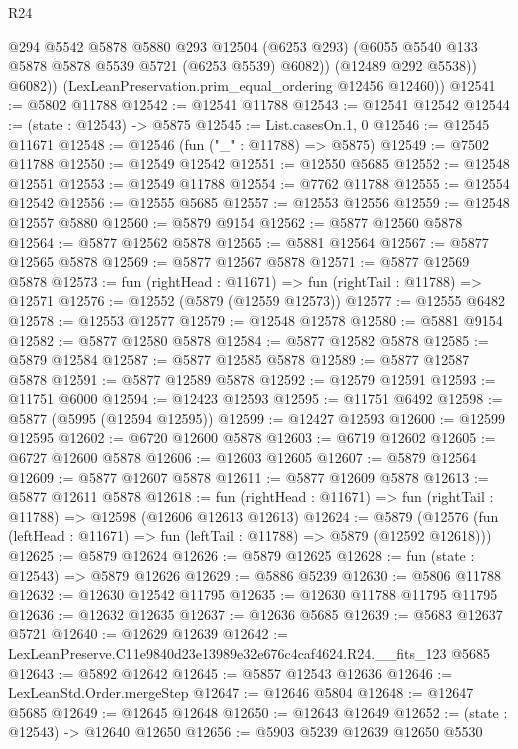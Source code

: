\begin{lexlean}{R24}
\begin{coremodule}
              @294
              @5542
              @5878
              @5880
              @293
              @12504
              (@6253 @293)
              (@6055 @5540 @133 @5878 @5878 @5539 @5721 (@6253 @5539) @6082))
            (@12489 @292 @5538))
          @6082))
      (LexLeanPreservation.prim_equal_ordering @12456 @12460))
@12541 := @5802 @11788
@12542 := @12541 @11788
@12543 := @12541 @12542
@12544 := (state : @12543) -> @5875
@12545 := List.casesOn.{1, 0}
@12546 := @12545 @11671
@12548 := @12546 (fun ("_" : @11788) => @5875)
@12549 := @7502 @11788
@12550 := @12549 @12542
@12551 := @12550 @5685
@12552 := @12548 @12551
@12553 := @12549 @11788
@12554 := @7762 @11788
@12555 := @12554 @12542
@12556 := @12555 @5685
@12557 := @12553 @12556
@12559 := @12548 @12557 @5880
@12560 := @5879 @9154
@12562 := @5877 @12560 @5878
@12564 := @5877 @12562 @5878
@12565 := @5881 @12564
@12567 := @5877 @12565 @5878
@12569 := @5877 @12567 @5878
@12571 := @5877 @12569 @5878
@12573 := fun (rightHead : @11671) => fun (rightTail : @11788) => @12571
@12576 := @12552 (@5879 (@12559 @12573))
@12577 := @12555 @6482
@12578 := @12553 @12577
@12579 := @12548 @12578
@12580 := @5881 @9154
@12582 := @5877 @12580 @5878
@12584 := @5877 @12582 @5878
@12585 := @5879 @12584
@12587 := @5877 @12585 @5878
@12589 := @5877 @12587 @5878
@12591 := @5877 @12589 @5878
@12592 := @12579 @12591
@12593 := @11751 @6000
@12594 := @12423 @12593
@12595 := @11751 @6492
@12598 := @5877 (@5995 (@12594 @12595))
@12599 := @12427 @12593
@12600 := @12599 @12595
@12602 := @6720 @12600 @5878
@12603 := @6719 @12602
@12605 := @6727 @12600 @5878
@12606 := @12603 @12605
@12607 := @5879 @12564
@12609 := @5877 @12607 @5878
@12611 := @5877 @12609 @5878
@12613 := @5877 @12611 @5878
@12618 := fun (rightHead : @11671) => fun (rightTail : @11788) => @12598 (@12606 @12613 @12613)
@12624 := @5879
    (@12576 (fun (leftHead : @11671) => fun (leftTail : @11788) => @5879 (@12592 @12618)))
@12625 := @5879 @12624
@12626 := @5879 @12625
@12628 := fun (state : @12543) => @5879 @12626
@12629 := @5886 @5239
@12630 := @5806 @11788
@12632 := @12630 @12542 @11795
@12635 := @12630 @11788 @11795 @11795
@12636 := @12632 @12635
@12637 := @12636 @5685
@12639 := @5683 @12637 @5721
@12640 := @12629 @12639
@12642 := LexLeanPreserve.C11e9840d23e13989e32e676c4caf4624.R24.__fits_123 @5685
@12643 := @5892 @12642
@12645 := @5857 @12543 @12636
@12646 := LexLeanStd.Order.mergeStep
@12647 := @12646 @5804
@12648 := @12647 @5685
@12649 := @12645 @12648
@12650 := @12643 @12649
@12652 := (state : @12543) -> @12640 @12650
@12656 := @5903 @5239 @12639 @12650 @5530

\end{coremodule}
\end{lexlean}
